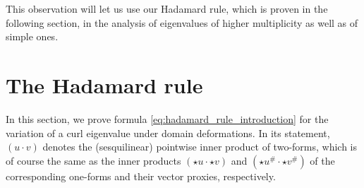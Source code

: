 \documentclass[11pt,reqno]{amsart}
\begin{document}
This observation will let us use our Hadamard rule, which is proven in the following section, in the analysis of eigenvalues of higher multiplicity as well as of simple ones.

\section{The Hadamard rule}\label{section: The Hadamard rule}

In this section, we prove formula \eqref{eq:hadamard_rule_introduction} for the variation of a curl eigenvalue under domain deformations. In its statement, $(u\cdot v)$ denotes the (sesquilinear) pointwise inner product of two-forms, which is of course the same as the inner products $(\star u \cdot \star v)$ and $(\star u^\# \cdot \star v^\#)$ of the corresponding one-forms and their vector proxies, respectively.
\end{document}
